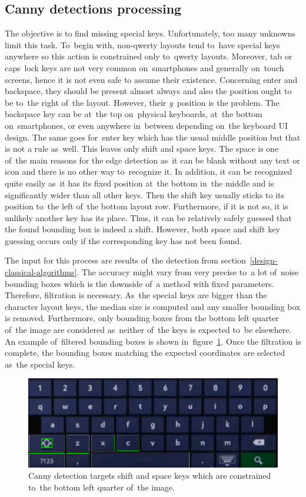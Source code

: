 \subsection{Canny detections processing}
\label{postprocessing-canny}
The objective is to find missing special keys. Unfortunately, too many unknowns limit this task. To~begin with, non-qwerty layouts tend to~have special keys anywhere so this action is constrained only to~qwerty layouts. Moreover, tab or caps~lock keys are not very common on~smartphones and generally on~touch screens, hence it is not even safe to assume their existence. Concerning enter and backspace, they should be present almost always and also the position ought to be to~the right of~the layout. However, their \emph{y}~position is the problem. The backspace key can be at~the top on~physical keyboards, at~the bottom on~smartphones, or even anywhere in~between depending on~the keyboard UI design. The same goes for~enter key which has the usual middle position but that is not a rule as~well. This leaves only shift and space keys. The space is one of~the main reasons for the edge detection as~it can be blank without any text or icon and there is no other way to~recognize it. In addition, it can be recognized quite easily as~it has its fixed position at~the bottom in~the middle and is significantly wider than all other keys. Then the shift key usually sticks to its position to~the left of~the bottom layout row. Furthermore, if it is not so, it is unlikely another key has its place. Thus, it can be relatively safely guessed that the found bounding box is indeed a shift. However, both space and shift key guessing occurs only if the corresponding key has not been found.

The input for this process are results of~the detection from section~\ref{design-classical-algorithms}. The accuracy might vary from very precise to~a lot of~noise bounding boxes which is the downside of~a method with fixed parameters. Therefore, filtration is necessary. As~the special keys are bigger than the character layout keys, the median size is computed and any smaller bounding box is removed. Furthermore, only bounding boxes from the bottom left quarter of~the image are considered as~neither of~the keys is expected to~be elsewhere. An example of~filtered bounding boxes is shown in~figure~\ref{demo-canny}. Once the filtration is complete, the bounding boxes matching the expected coordinates are selected as~the special keys.

\begin{figure}[hbt]
    \includegraphics[width=1\textwidth]{img/design/demo-canny.png}
    \caption{Canny detection targets shift and space keys which are constrained to~the bottom left quarter of~the image.}
    \label{demo-canny}
\end{figure}

